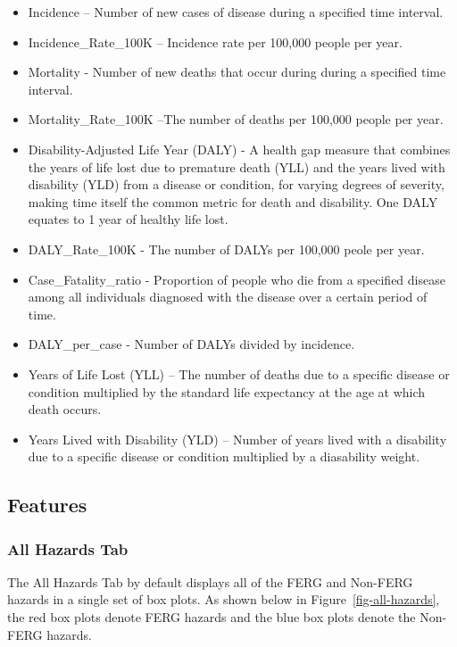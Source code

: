 \documentclass[
  letterpaper,
  DIV=11,
  numbers=noendperiod]{scrartcl}
\begin{document}
\begin{itemize}
\item
  Incidence -- Number of new cases of disease during a specified time
  interval.
\item
  Incidence\_Rate\_100K -- Incidence rate per 100,000 people per year.
\item
  Mortality - Number of new deaths that occur during during a specified
  time interval.
\item
  Mortality\_Rate\_100K --The number of deaths per 100,000 people per
  year.
\item
  Disability-Adjusted Life Year (DALY) - A health gap measure that
  combines the years of life lost due to premature death (YLL) and the
  years lived with disability (YLD) from a disease or condition, for
  varying degrees of severity, making time itself the common metric for
  death and disability. One DALY equates to 1 year of healthy life lost.
\item
  DALY\_Rate\_100K - The number of DALYs per 100,000 peole per year.
\item
  Case\_Fatality\_ratio - Proportion of people who die from a specified
  disease among all individuals diagnosed with the disease over a
  certain period of time.
\item
  DALY\_per\_case - Number of DALYs divided by incidence.
\item
  Years of Life Lost (YLL) -- The number of deaths due to a specific
  disease or condition multiplied by the standard life expectancy at the
  age at which death occurs.
\item
  Years Lived with Disability (YLD) -- Number of years lived with a
  disability due to a specific disease or condition multiplied by a
  diasability weight.
\end{itemize}

\subsection{Features}\label{features}

\subsubsection{All Hazards Tab}\label{all-hazards-tab}

The All Hazards Tab by default displays all of the FERG and Non-FERG
hazards in a single set of box plots. As shown below in
Figure~\ref{fig-all-hazards}, the red box plots denote FERG hazards and
the blue box plots denote the Non-FERG hazards.
\end{document}
